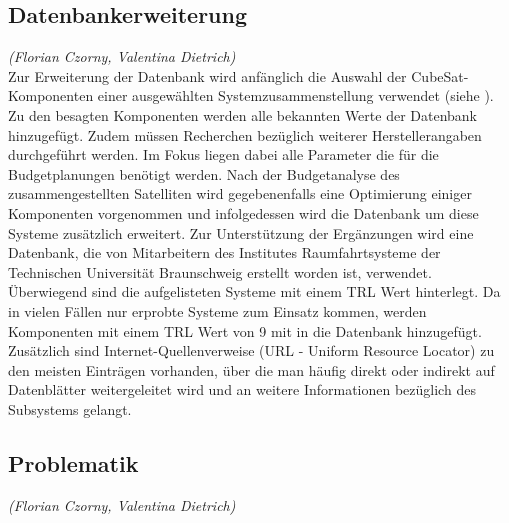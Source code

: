 			\subsection{Datenbankerweiterung}
			\hfill\emph{(Florian Czorny, Valentina Dietrich)}\\
			
			Zur Erweiterung der Datenbank wird anfänglich die Auswahl der CubeSat-Komponenten einer ausgewählten Systemzusammenstellung verwendet (siehe ). Zu den besagten Komponenten werden alle bekannten Werte der Datenbank hinzugefügt. Zudem müssen Recherchen bezüglich weiterer Herstellerangaben durchgeführt werden. Im Fokus liegen dabei alle Parameter die für die Budgetplanungen benötigt werden. Nach der Budgetanalyse des zusammengestellten Satelliten wird gegebenenfalls eine Optimierung einiger Komponenten vorgenommen und infolgedessen wird die Datenbank um diese Systeme zusätzlich erweitert. Zur Unterstützung der Ergänzungen wird eine  Datenbank, die von Mitarbeitern des Institutes Raumfahrtsysteme der Technischen Universität Braunschweig erstellt worden ist, verwendet. Überwiegend sind die aufgelisteten Systeme mit einem TRL Wert hinterlegt. Da in vielen Fällen nur erprobte Systeme zum Einsatz kommen, werden Komponenten mit einem TRL Wert von \num{9} mit in die Datenbank hinzugefügt. Zusätzlich sind Internet-Quellenverweise (URL - Uniform Resource Locator) zu den meisten Einträgen vorhanden, über die man häufig direkt oder indirekt auf Datenblätter weitergeleitet wird und an weitere Informationen bezüglich des Subsystems gelangt.
			
			\subsection{Problematik}
			\hfill\emph{(Florian Czorny, Valentina Dietrich)}\\
			
